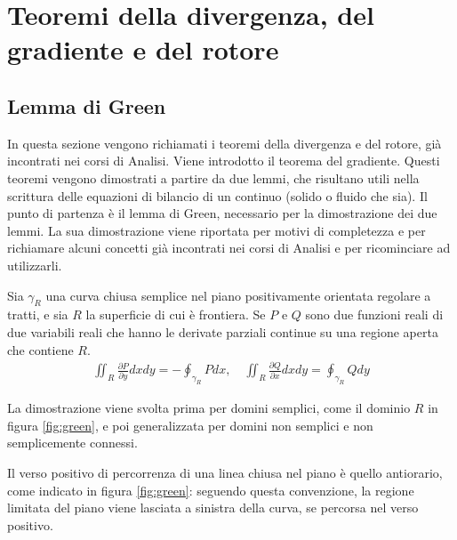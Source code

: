 \section{Teoremi della divergenza, del gradiente e del rotore}
\subsection{Lemma di Green}
In questa sezione vengono richiamati i teoremi della divergenza e del rotore, già incontrati nei corsi di Analisi. Viene introdotto il teorema del gradiente. Questi teoremi vengono dimostrati a partire da due lemmi, che risultano utili nella scrittura delle equazioni di bilancio di un continuo (solido o fluido che sia). Il punto di partenza è il lemma di Green, necessario per la dimostrazione dei due lemmi. La sua dimostrazione viene riportata per motivi di completezza e per richiamare alcuni concetti già incontrati nei corsi di Analisi e per ricominciare ad utilizzarli.

\begin{theorem}\label{thm:green}
Sia $\gamma_R$ una curva chiusa semplice nel piano positivamente orientata regolare a tratti, e sia $R$ la superficie di cui è frontiera. Se $P$ e $Q$ sono due funzioni reali di due variabili reali che hanno le derivate parziali continue su una regione aperta che contiene $R$.
\begin{equation}\label{eqn:green_thm} 
\begin{aligned}
 \iint_R \frac{\partial P}{\partial y} dx dy  = 
   - \oint_{\gamma_R} P dx,  \quad
  \iint_R \frac{\partial Q}{\partial x} dx dy = 
    \oint_{\gamma_R} Q dy
\end{aligned}
\end{equation}
\end{theorem}
%
La dimostrazione viene svolta prima per domini semplici, come il dominio $R$ in figura \ref{fig:green}, e poi generalizzata per domini non semplici e non semplicemente connessi.
\begin{remark}
 Il verso positivo di percorrenza di una linea chiusa nel piano è quello antiorario, come indicato in figura \ref{fig:green}: seguendo questa convenzione, la regione limitata del piano viene lasciata a sinistra della curva, se percorsa nel verso positivo.
\end{remark}

